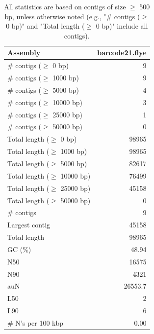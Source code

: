 \documentclass[12pt,a4paper]{article}
\begin{document}
\begin{table}[ht]
\begin{center}
\caption{All statistics are based on contigs of size $\geq$ 500 bp, unless otherwise noted (e.g., "\# contigs ($\geq$ 0 bp)" and "Total length ($\geq$ 0 bp)" include all contigs).}
\begin{tabular}{|l*{1}{|r}|}
\hline
Assembly & barcode21.flye \\ \hline
\# contigs ($\geq$ 0 bp) & 9 \\ \hline
\# contigs ($\geq$ 1000 bp) & 9 \\ \hline
\# contigs ($\geq$ 5000 bp) & 4 \\ \hline
\# contigs ($\geq$ 10000 bp) & 3 \\ \hline
\# contigs ($\geq$ 25000 bp) & 1 \\ \hline
\# contigs ($\geq$ 50000 bp) & 0 \\ \hline
Total length ($\geq$ 0 bp) & 98965 \\ \hline
Total length ($\geq$ 1000 bp) & 98965 \\ \hline
Total length ($\geq$ 5000 bp) & 82617 \\ \hline
Total length ($\geq$ 10000 bp) & 76499 \\ \hline
Total length ($\geq$ 25000 bp) & 45158 \\ \hline
Total length ($\geq$ 50000 bp) & 0 \\ \hline
\# contigs & 9 \\ \hline
Largest contig & 45158 \\ \hline
Total length & 98965 \\ \hline
GC (\%) & 48.94 \\ \hline
N50 & 16575 \\ \hline
N90 & 4321 \\ \hline
auN & 26553.7 \\ \hline
L50 & 2 \\ \hline
L90 & 6 \\ \hline
\# N's per 100 kbp & 0.00 \\ \hline
\end{tabular}
\end{center}
\end{table}
\end{document}
